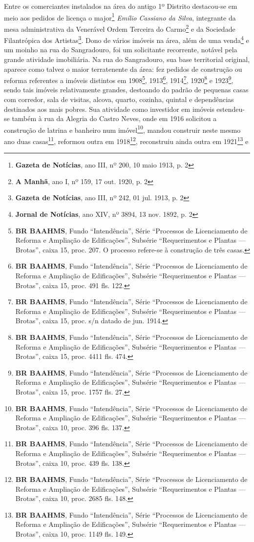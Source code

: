 Entre os comerciantes instalados na área do antigo 1º Distrito destacou-se em meio aos pedidos de licença o major\footnote{\textbf{Gazeta de Notícias}, ano III, nº 200, 10 maio 1913, p. 2} \textit{Emílio Cassiano da Silva}, integrante da mesa administrativa da Venerável Ordem Terceira do Carmo\footnote{\textbf{A Manhã}, ano I, nº 159, 17 out. 1920, p. 2} e da Sociedade Filantrópica dos Artistas\footnote{\textbf{Gazeta de Notícias}, ano III, nº 242, 01 jul. 1913, p. 2}. Dono de vários imóveis na área, além de uma venda\footnote{\textbf{Jornal de Notícias}, ano XIV, nº 3894, 13 nov. 1892, p. 2} e um moinho \cite[p.~433]{reis_almanak_1898} na rua do Sangradouro, foi um solicitante recorrente, notável pela grande atividade imobiliária. Na rua do Sangradouro, sua base territorial original, aparece como talvez o maior terratenente da área: fez pedidos de construção ou reforma referentes a imóveis distintos em 1908\footnote{\textbf{BR BAAHMS}, Fundo ``Intendência'', Série ``Processos de Licenciamento de Reforma e Ampliação de Edificações'', Subsérie ``Requerimentos e Plantas --- Brotas'', caixa 15, proc. 207. O processo refere-se à construção de três casas.}, 1913\footnote{\textbf{BR BAAHMS}, Fundo ``Intendência'', Série ``Processos de Licenciamento de Reforma e Ampliação de Edificações'', Subsérie ``Requerimentos e Plantas --- Brotas'', caixa 15, proc. 491 fls. 122.}, 1914\footnote{\textbf{BR BAAHMS}, Fundo ``Intendência'', Série ``Processos de Licenciamento de Reforma e Ampliação de Edificações'', Subsérie ``Requerimentos e Plantas --- Brotas'', caixa 15, proc. s/n datado de jun. 1914.}, 1920\footnote{\textbf{BR BAAHMS}, Fundo ``Intendência'', Série ``Processos de Licenciamento de Reforma e Ampliação de Edificações'', Subsérie ``Requerimentos e Plantas --- Brotas'', caixa 15, proc. 4411 fls. 474.} e 1923\footnote{\textbf{BR BAAHMS}, Fundo ``Intendência'', Série ``Processos de Licenciamento de Reforma e Ampliação de Edificações'', Subsérie ``Requerimentos e Plantas --- Brotas'', caixa 15, proc. 1757 fls. 27.}, sendo tais imóveis relativamente grandes, destoando do padrão de pequenas casas com corredor, sala de visitas, alcova, quarto, cozinha, quintal e dependências destinados aos mais pobres. Sua atividade como investidor em imóveis estendeu-se também à rua da Alegria do Castro Neves, onde em 1916 solicitou a construção de latrina e banheiro num imóvel\footnote{\textbf{BR BAAHMS}, Fundo ``Intendência'', Série ``Processos de Licenciamento de Reforma e Ampliação de Edificações'', Subsérie ``Requerimentos e Plantas --- Brotas'', caixa 10, proc. 396 fls. 137.}, mandou construir neste mesmo ano duas casas\footnote{\textbf{BR BAAHMS}, Fundo ``Intendência'', Série ``Processos de Licenciamento de Reforma e Ampliação de Edificações'', Subsérie ``Requerimentos e Plantas --- Brotas'', caixa 10, proc. 439 fls. 138.}, reformou outra em 1918\footnote{\textbf{BR BAAHMS}, Fundo ``Intendência'', Série ``Processos de Licenciamento de Reforma e Ampliação de Edificações'', Subsérie ``Requerimentos e Plantas --- Brotas'', caixa 10, proc. 2685 fls. 148.}, reconstruiu ainda outra em 1921\footnote{\textbf{BR BAAHMS}, Fundo ``Intendência'', Série ``Processos de Licenciamento de Reforma e Ampliação de Edificações'', Subsérie ``Requerimentos e Plantas --- Brotas'', caixa 10, proc. 1149 fls. 149.} e 